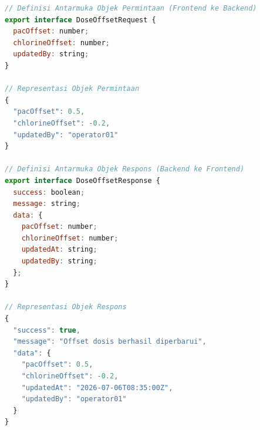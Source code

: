 \begin{minipage}{\textwidth}
\begin{lstlisting}[caption={Kontrak antarmuka permintaan (request) dan respons untuk offset dosis}, label={lst:dose-offset}, frame=single, captionpos=t, language=JavaScript]
// Definisi Antarmuka Objek Permintaan (Frontend ke Backend)
export interface DoseOffsetRequest {
  pacOffset: number;
  chlorineOffset: number;
  updatedBy: string;
}

// Representasi Objek Permintaan
{
  "pacOffset": 0.5,
  "chlorineOffset": -0.2,
  "updatedBy": "operator01"
}

// Definisi Antarmuka Objek Respons (Backend ke Frontend)
export interface DoseOffsetResponse {
  success: boolean;
  message: string;
  data: {
    pacOffset: number;
    chlorineOffset: number;
    updatedAt: string;
    updatedBy: string;
  };
}

// Representasi Objek Respons
{
  "success": true,
  "message": "Offset dosis berhasil diperbarui",
  "data": {
    "pacOffset": 0.5,
    "chlorineOffset": -0.2,
    "updatedAt": "2026-07-06T08:35:00Z",
    "updatedBy": "operator01"
  }
}
\end{lstlisting}
\end{minipage}
